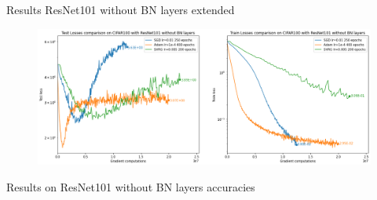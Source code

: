 \documentclass[10pt]{beamer}
\begin{document}
\begin{frame}{Results ResNet101 without BN layers extended}
    \begin{figure}
        \centering
        \includegraphics[width=\textwidth]{report/figures/CIFAR100noBN.png}
    \end{figure}
\end{frame}

\begin{frame}{Results on ResNet101 without BN layers accuracies}
    \begin{table}[h]
    \begin{center}
        \begin{tabular}{||c | c | c||}
             \hline
             
        \end{tabular}
    \end{center}
    \end{table}
\end{frame}
\end{document}
